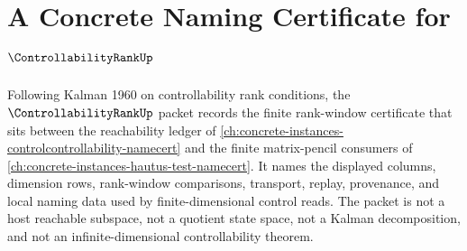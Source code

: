 \chapter{A Concrete Naming Certificate for $\ControllabilityRankUp$}
\label{ch:concrete-instances-controllability-rank-namecert}

Following Kalman 1960 on controllability rank conditions, the $\ControllabilityRankUp$ packet records the finite rank-window certificate that sits between the reachability ledger of \autoref{ch:concrete-instances-controlcontrollability-namecert} and the finite matrix-pencil consumers of \autoref{ch:concrete-instances-hautus-test-namecert}. It names the displayed columns, dimension rows, rank-window comparisons, transport, replay, provenance, and local naming data used by finite-dimensional control reads. The packet is not a host reachable subspace, not a quotient state space, not a Kalman decomposition, and not an infinite-dimensional controllability theorem.

